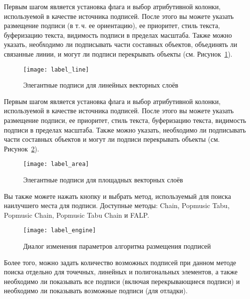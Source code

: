 
Первым шагом является установка флага 
и выбор атрибутивной колонки, используемой в качестве источника подписей.
После этого вы можете указать размещение подписи (в т.\,ч. ее ориентацию),
ее приоритет, стиль текста, буферизацию текста, видимость подписи в пределах
масштаба. Также можно указать, необходимо ли подписывать части составных
объектов, объединять ли связанные линии, и могут ли подписи перекрывать объекты
(см. Рисунок~\ref{fig:linelabel}).

\begin{figure}[ht]
\centering
   \texttt{[image: label\_line]}
   \caption{Элегантные подписи для линейных векторных слоёв \wincaption}\label{fig:linelabel}
\end{figure}


Первым шагом является установка флага 
и выбор атрибутивной колонки, используемой в качестве источника подписей.
После этого вы можете указать размещение подписи, ее приоритет, стиль
текста, буферизацию текста, видимость подписи в пределах масштаба. Также
можно указать, необходимо ли подписывать части составных объектов и могут
ли подписи перекрывать объекты (см. Рисунок~\ref{fig:arealabel}).

\begin{figure}[ht]
\centering
   \texttt{[image: label\_area]}
   \caption{Элегантные подписи для площадных векторных слоёв \wincaption}\label{fig:arealabel}
\end{figure}


Вы также можете нажать кнопку  и выбрать метод,
используемый для поиска наилучшего места для подписи. Доступные методы:
Chain, Popmusic Tabu, Popmusic Chain, Popmusic Tabu Chain и FALP.

\begin{figure}[ht]
\centering
   \texttt{[image: label\_engine]}
   \caption{Диалог изменения параметров алгоритма размещения подписей \wincaption}\label{fig:labelengine}
\end{figure}

Более того, можно задать количество возможных подписей при данном методе
поиска отдельно для точечных, линейных и полигональных элементов, а также
необходимо ли показывать все подписи (включая перекрывающиеся подписи) и
необходимо ли показывать возможные подписи (для отладки).

